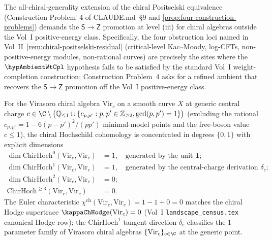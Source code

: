 \begin{remark}
\label{rem:cp4-via-stage-stratification}
The all-chiral-generality extension of the chiral Positselski
equivalence (Construction Problem~4 of CLAUDE.md~\S 9 and
\cref{prop:four-construction-problems}) demands the $\mathsf{S} \to
\mathsf{Z}$ promotion at level (iii) for chiral algebras outside
the Vol~I positive-energy class. Specifically, the four obstruction
loci named in
Vol~II~\cref{rem:chiral-positselski-residual} (critical-level
Kac--Moody, log-CFTs, non-positive-energy modules,
non-rational curves) are precisely the sites where the
$\hypAmbientWtCpl$ hypothesis fails to be satisfied by the
standard Vol~I weight-completion construction; Construction
Problem~4 asks for a refined ambient that recovers the
$\mathsf{S} \to \mathsf{Z}$ promotion off the Vol~I positive-energy
class.
\end{remark}

\begin{theorem}
\label{thm:chirhoch-virasoro-concentration}%
%
%
For the Virasoro chiral algebra $\mathrm{Vir}_c$ on a smooth curve
$X$ at generic central charge $c \in \C \setminus
\bigl(\mathbb{Q}_{\le 1} \cup \{c_{p, p'} : p, p' \in \mathbb{Z}_{\ge 2},
\gcd(p, p') = 1\}\bigr)$ \textup(excluding the rational
$c_{p, p'} = 1 - 6 (p - p')^2 / (p p')$ minimal-model points and the
free-boson value $c \le 1$\textup), the chiral Hochschild
cohomology is concentrated in degrees $\{0, 1\}$ with explicit
dimensions
\begin{align*}
\dim \mathrm{ChirHoch}^0(\mathrm{Vir}_c, \mathrm{Vir}_c) &= 1,
 \quad \text{generated by the unit } \mathbf{1};\\
\dim \mathrm{ChirHoch}^1(\mathrm{Vir}_c, \mathrm{Vir}_c) &= 1,
 \quad \text{generated by the central-charge derivation } \delta_c;\\
\dim \mathrm{ChirHoch}^2(\mathrm{Vir}_c, \mathrm{Vir}_c) &= 0;\\
\mathrm{ChirHoch}^{\geq 3}(\mathrm{Vir}_c, \mathrm{Vir}_c) &= 0.
\end{align*}
The Euler characteristic
$\chi^{\mathrm{ch}}(\mathrm{Vir}_c, \mathrm{Vir}_c) = 1 - 1 + 0 = 0$
matches the chiral Hodge supertrace
$\kappaChHodge(\mathrm{Vir}_c) = 0$ \textup(Vol~I
\texttt{landscape\_census.tex} canonical Hodge row\textup); the
$\mathrm{ChirHoch}^1$ tangent direction $\delta_c$ classifies
the $1$-parameter family of Virasoro chiral algebras
$\{\mathrm{Vir}_c\}_{c \in \C}$ at the generic point.
\end{theorem}

